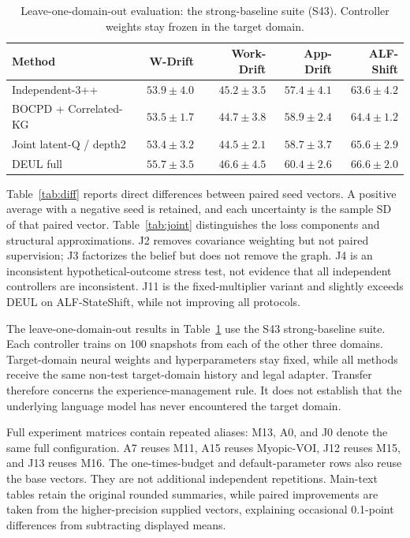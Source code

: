 \documentclass[sigconf,anonymous,review]{acmart}
\theoremstyle{zhplain}
\begin{document}


\begin{table}[t]
\centering
\caption{Leave-one-domain-out evaluation: the strong-baseline suite (S43). Controller weights stay frozen in the target domain.}
\label{tab:lodo}
\small
\begin{tabular}{@{}lrrrr@{}}
\toprule
Method & W-Drift & Work-Drift & App-Drift & ALF-Shift \\
\midrule
Independent-3++ & \(53.9\!\pm\!4.0\) & \(45.2\!\pm\!3.5\) & \(57.4\!\pm\!4.1\) & \(63.6\!\pm\!4.2\) \\
BOCPD + Correlated-KG & \(53.5\!\pm\!1.7\) & \(44.7\!\pm\!3.8\) & \(58.9\!\pm\!2.4\) & \(64.4\!\pm\!1.2\) \\
Joint latent-Q / depth2 & \(53.4\!\pm\!3.2\) & \(44.5\!\pm\!2.1\) & \(58.7\!\pm\!3.7\) & \(65.6\!\pm\!2.9\) \\
DEUL full & \(55.7\!\pm\!3.5\) & \(46.6\!\pm\!4.5\) & \(60.4\!\pm\!2.6\) & \(66.6\!\pm\!2.0\) \\
\bottomrule
\end{tabular}
\end{table}


Table~\ref{tab:diff} reports direct differences between paired seed vectors. A positive average with a negative seed is retained, and each uncertainty is the sample SD of that paired vector. Table~\ref{tab:joint} distinguishes the loss components and structural approximations. J2 removes covariance weighting but not paired supervision; J3 factorizes the belief but does not remove the graph. J4 is an inconsistent hypothetical-outcome stress test, not evidence that all independent controllers are inconsistent. J11 is the fixed-multiplier variant and slightly exceeds DEUL on ALF-StateShift, while not improving all protocols.

The leave-one-domain-out results in Table~\ref{tab:lodo} use the S43 strong-baseline suite. Each controller trains on 100 snapshots from each of the other three domains. Target-domain neural weights and hyperparameters stay fixed, while all methods receive the same non-test target-domain history and legal adapter. Transfer therefore concerns the experience-management rule. It does not establish that the underlying language model has never encountered the target domain.

Full experiment matrices contain repeated aliases: M13, A0, and J0 denote the same full configuration. A7 reuses M11, A15 reuses Myopic-VOI, J12 reuses M15, and J13 reuses M16. The one-times-budget and default-parameter rows also reuse the base vectors. They are not additional independent repetitions. Main-text tables retain the original rounded summaries, while paired improvements are taken from the higher-precision supplied vectors, explaining occasional 0.1-point differences from subtracting displayed means.

\end{document}
